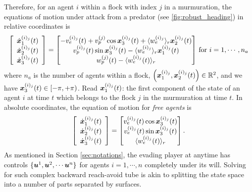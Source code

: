 Therefore, for an agent $i$ within a flock with index $j$ in a murmuration, the equations of motion under attack from a predator (see \autoref{fig:robust_heading}) in relative coordinates is %
%
\begin{align}
\left[\begin{array}{c}
\dot{\state}_1^{(i)_j}(t) \\ \dot{\state}_2^{(i)_j} (t) \\ \dot{\state}_3^{(i)_j} (t)
\end{array}\right] = \begin{bmatrix}
-v_e^{(i)_j}(t) + v_p^{(j)} \cos \state_3^{(i)_j}(t) + \langle w_e^{(i)_j} \rangle_r \state_2^{(i)_j}(t)
%
\\
v_p^{(i)_j}(t)\sin \state_3^{(i)_j}(t) - \langle w_e^{(i)_j} \rangle_r \state_1^{(i)_j}(t)
\\ 
w_p^{(j)}(t) - \langle w_e^{(i)_j}(t) \rangle_r
\end{bmatrix} \, \text{for } i=1,\cdots, n_a
\end{align}
%
where $n_a$ is the number of agents within a flock, $\left(\bm{x}_1^{(i)_j}, {\bm{x}}_2^{(i)_j} (t)\right) \in \mathbb{R}^2$, and  we have $\bm{x}_3^{(i)_j} (t) \in \left[-\pi, +\pi\right)$. Read ${\bm{x}}_1^{(i)_j}(t)$: the first component of the state of an agent $i$ at time $t$ which belongs to the flock $j$ in the murmuration at time $t$. In absolute coordinates, the equation of motion for \textit{free agents} is 
%
\begin{align}\left[\begin{array}{c}
		\dot{\bm{x}}_1^{(i)_j}(t) \\ \dot{\bm{x}}_2^{(i)_j} (t) \\ \dot{\bm{x}}_3^{(i)_j} (t)
	\end{array}\right] = \begin{bmatrix}
		v_e^{(i)_j}(t) \cos \bm{x}_3^{(i)_j}(t) 
		\\
		v_e^{(i)_j}(t)\sin \bm{x}_3^{(i)_j}(t) 
		\\ 
		\langle w_e^{(i)_j}(t) \rangle_r
	\end{bmatrix}.
\end{align}
%
As mentioned in Section \ref{sec:notations}, the evading player at anytime has controls $\{\bm{u}^1, \bm{u}^2, \cdots \bm{u}^n\}$ for agents $i=1, \cdots, n$ completely  under its will. Solving for such complex backward reach-avoid tube is akin to splitting the state space into a number of parts separated by surfaces.  



